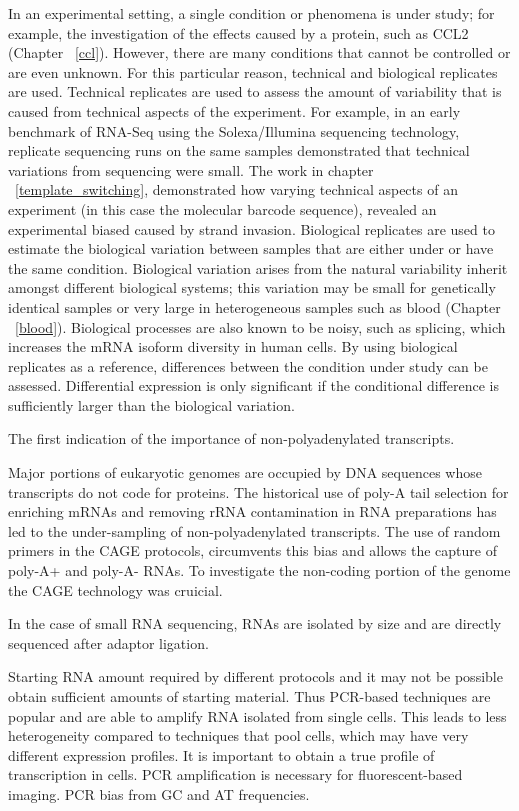 In an experimental setting, a single condition or phenomena is under study; for example, the investigation of the effects caused by a protein, such as CCL2 (Chapter ~\ref{ccl}). However, there are many conditions that cannot be controlled or are even unknown. For this particular reason, technical and biological replicates are used. Technical replicates are used to assess the amount of variability that is caused from technical aspects of the experiment. For example, in an early benchmark of RNA-Seq using the Solexa/Illumina sequencing technology, replicate sequencing runs on the same samples demonstrated that technical variations from sequencing were small\cite{pmid18550803}. The work in chapter ~\ref{template_switching}, demonstrated how varying technical aspects of an experiment (in this case the molecular barcode sequence), revealed an experimental biased caused by strand invasion\cite{Tang01022013}. Biological replicates are used to estimate the biological variation between samples that are either under or have the same condition. Biological variation arises from the natural variability inherit amongst different biological systems; this variation may be small for genetically identical samples or very large in heterogeneous samples such as blood (Chapter ~\ref{blood}). Biological processes are also known to be noisy, such as splicing, which increases the mRNA isoform diversity in human cells\cite{pmid21151575}. By using biological replicates as a reference, differences between the condition under study can be assessed. Differential expression is only significant if the conditional difference is sufficiently larger than the biological variation.

The first indication of the importance of non-polyadenylated transcripts\cite{pmid4213457}.

Major portions of eukaryotic genomes are occupied by DNA sequences whose transcripts do not code for proteins. The historical use of poly-A tail selection for enriching mRNAs and removing rRNA contamination in RNA preparations has led to the under-sampling of non-polyadenylated transcripts. The use of random primers in the CAGE protocols, circumvents this bias and allows the capture of poly-A+ and poly-A- RNAs. To investigate the non-coding portion of the genome the CAGE technology was cruicial.

In the case of small RNA sequencing, RNAs are isolated by size and are directly sequenced after adaptor ligation.

Starting RNA amount required by different protocols and it may not be possible obtain sufficient amounts of starting material. Thus PCR-based techniques are popular and are able to amplify RNA isolated from single cells. This leads to less heterogeneity compared to techniques that pool cells, which may have very different expression profiles. It is important to obtain a true profile of transcription in cells. PCR amplification is necessary for fluorescent-based imaging. PCR bias from GC and AT frequencies.

